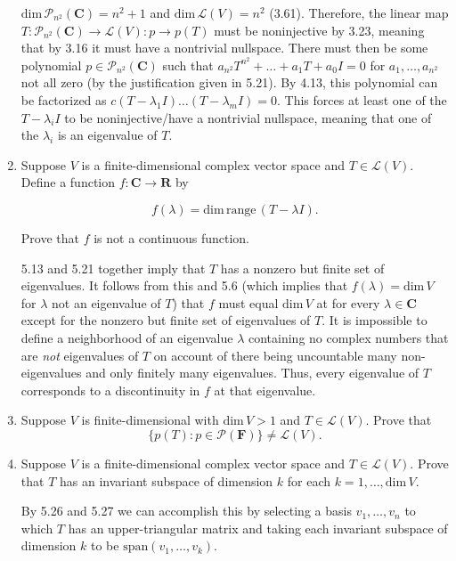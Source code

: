 \documentclass{book}
\begin{document}
\begin{enumerate}
\(\text{dim} \, \mathcal{P}_{n^2}(\textbf{C})=n^2+1\) and \(\text{dim} \, \mathcal{L}(V) = n^2\) (3.61).  Therefore, the linear map \(T:\mathcal{P}_{n^2}(\textbf{C}) \rightarrow \mathcal{L}(V):p \rightarrow p(T)\) must be noninjective by 3.23, meaning that by 3.16 it must have a nontrivial nullspace.  There must then be some polynomial \(p \in \mathcal{P}_{n^2}(\textbf{C})\) such that \(a_{n^2}T^{n^2}+\dots+a_1T+a_0I=0\) for \(a_1,\dots,a_{n^2}\) not all zero (by the justification given in 5.21).  By 4.13, this polynomial can be factorized as \(c(T-\lambda_1 I)\dots(T-\lambda_m I)=0\).  This forces at least one of the \(T-\lambda_i I\) to be noninjective/have a nontrivial nullspace, meaning that one of the \(\lambda_i\) is an eigenvalue of \(T\).

\item Suppose \(V\) is a finite-dimensional complex vector space and \(T \in \mathcal{L}(V)\).  Define a function \(f: \textbf{C} \rightarrow \textbf{R}\) by

\begin{equation*}
    f(\lambda)=\textrm{dim} \, \textrm{range} \, (T-\lambda I).
\end{equation*}

Prove that \(f\) is not a continuous function.

5.13 and 5.21 together imply that \(T\) has a nonzero but finite set of eigenvalues.  It follows from this and 5.6 (which implies that \(f(\lambda)=\text{dim} \, V\) for \(\lambda\) not an eigenvalue of \(T\)) that \(f\) must equal \(\text{dim} \, V\) at for every \(\lambda \in \textbf{C}\) except for the nonzero but finite set of eigenvalues of \(T\).  It is impossible to define a neighborhood of an eigenvalue \(\lambda\) containing no complex numbers that are \textit{not} eigenvalues of \(T\) on account of there being uncountable many non-eigenvalues and only finitely many eigenvalues.  Thus, every eigenvalue of \(T\) corresponds to a discontinuity in \(f\) at that eigenvalue.

\item Suppose \(V\) is finite-dimensional with \(\textrm{dim} \, V > 1\) and \(T \in \mathcal{L}(V)\).  Prove that \[\{p(T):p \in \mathcal{P}(\textbf{F})\} \neq \mathcal{L}(V).\]

\item Suppose \(V\) is a finite-dimensional complex vector space and \(T \in \mathcal{L}(V)\).  Prove that \(T\) has an invariant subspace of dimension \(k\) for each \(k=1,\dots,\textrm{dim} \, V\).

By 5.26 and 5.27 we can accomplish this by selecting a basis \(v_1,\dots,v_n\) to which \(T\) has an upper-triangular matrix and taking each invariant subspace of dimension \(k\) to be \(\text{span}(v_1,\dots,v_k)\).

\end{enumerate}
\end{document}
